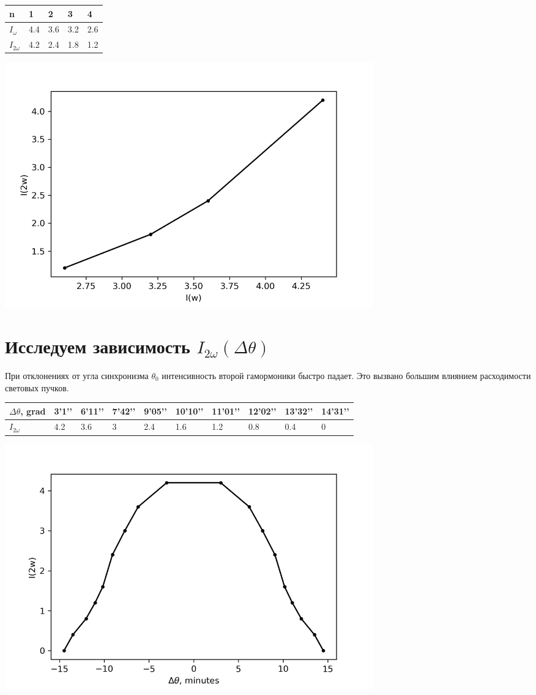\documentclass[a4paper,14pt]{article} %
\begin{document}
\begin{table}[H]
\begin{tabular}{|l|l|l|l|l|}
\hline
n     & 1   & 2   & 3   & 4   \\ \hline
$I_{\omega}$  & 4.4 & 3.6 & 3.2 & 2.6 \\ \hline
$I_{2 \omega}$ & 4.2 & 2.4 & 1.8 & 1.2 \\ \hline
\end{tabular}
\end{table}

\begin{center}
\includegraphics[width = 0.7\textwidth]{images/plot_1}
\end{center}

\section{Исследуем зависимость $I_{2\omega} (\Delta \theta)$}
При отклонениях от угла синхронизма $\theta_0$ интенсивность второй гамормоники быстро падает. Это вызвано большим влиянием расходимости световых пучков.

\begin{table}[H]
\begin{tabular}{|l|l|l|l|l|l|l|l|l|l|}
\hline
$\Delta \theta$, grad & 3’1’’ & 6’11’’ & 7’42’’ & 9’05’’ & 10’10’’ & 11’01’’ & 12’02’’ & 13’32’’ & 14’31’’ \\ \hline
$I_{2 \omega}$           & 4.2   & 3.6    & 3      & 2.4    & 1.6     & 1.2     & 0.8     & 0.4     & 0       \\ \hline
\end{tabular}
\end{table}

\begin{center}
\includegraphics[width = 0.7\textwidth]{images/plot_2}
\end{center}
\end{document}
